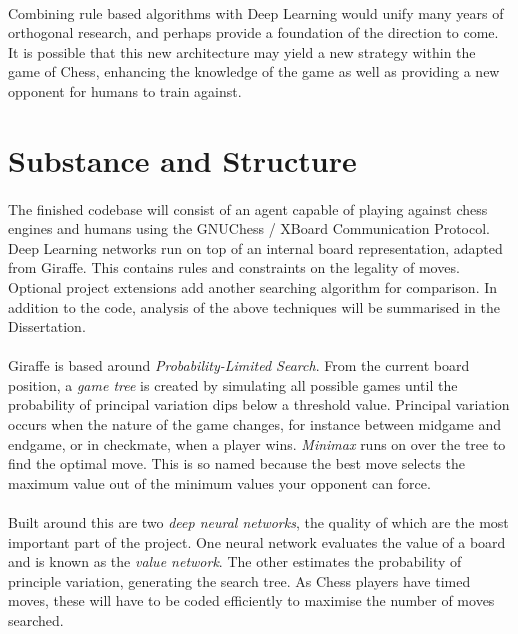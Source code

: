 \documentclass[a4paper]{article}
\begin{document}
\paragraph{}Combining rule based algorithms with Deep Learning would unify many years of orthogonal research, and perhaps provide a foundation of the direction to come. It is possible that this new architecture may yield a new strategy within the game of Chess, enhancing the knowledge of the game as well as providing a new opponent for humans to train against.

\section*{Substance and Structure}

\paragraph{}The finished codebase will consist of an agent capable of playing against chess engines and humans using the GNUChess / XBoard Communication Protocol. Deep Learning networks run on top of an internal board representation, adapted from Giraffe. This contains rules and constraints on the legality of moves. Optional project extensions add another searching algorithm for comparison. In addition to the code, analysis of the above techniques will be summarised in the Dissertation.

\paragraph{}Giraffe is based around \textit{Probability-Limited Search}. From the current board position, a \textit{game tree} is created by simulating all possible games until the probability of principal variation dips below a threshold value. Principal variation occurs when the nature of the game changes, for instance between midgame and endgame, or in checkmate, when a player wins. \textit{Minimax} runs on over the tree to find the optimal move. This is so named because the best move selects the maximum value out of the minimum values your opponent can force.

\paragraph{}Built around this are two \textit{deep neural networks}, the quality of which are the most important part of the project. One neural network evaluates the value of a board and is known as the \textit{value network}. The other estimates the probability of principle variation, generating the search tree. As Chess players have timed moves, these will have to be coded efficiently to maximise the number of moves searched.
\end{document}
